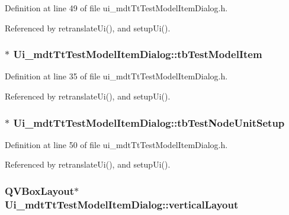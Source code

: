 Definition at line 49 of file ui\-\_\-mdt\-Tt\-Test\-Model\-Item\-Dialog.\-h.



Referenced by retranslate\-Ui(), and setup\-Ui().

\hypertarget{class_ui__mdt_tt_test_model_item_dialog_a3f8d368b30537ea891446850c9a14169}{
\subsubsection[{tb\-Test\-Model\-Item}]{$\ast$ Ui\-\_\-mdt\-Tt\-Test\-Model\-Item\-Dialog\-::tb\-Test\-Model\-Item}}\label{class_ui__mdt_tt_test_model_item_dialog_a3f8d368b30537ea891446850c9a14169}


Definition at line 35 of file ui\-\_\-mdt\-Tt\-Test\-Model\-Item\-Dialog.\-h.



Referenced by retranslate\-Ui(), and setup\-Ui().

\hypertarget{class_ui__mdt_tt_test_model_item_dialog_a64aab0eceb38eec9067c7d7ba2bf5fd9}{
\subsubsection[{tb\-Test\-Node\-Unit\-Setup}]{$\ast$ Ui\-\_\-mdt\-Tt\-Test\-Model\-Item\-Dialog\-::tb\-Test\-Node\-Unit\-Setup}}\label{class_ui__mdt_tt_test_model_item_dialog_a64aab0eceb38eec9067c7d7ba2bf5fd9}


Definition at line 50 of file ui\-\_\-mdt\-Tt\-Test\-Model\-Item\-Dialog.\-h.



Referenced by retranslate\-Ui(), and setup\-Ui().

\hypertarget{class_ui__mdt_tt_test_model_item_dialog_ab9d49ef493d8a1e57d1d15f2eed4a85f}{
\subsubsection[{vertical\-Layout}]{\setlength{\rightskip}{0pt plus 5cm}Q\-V\-Box\-Layout$\ast$ Ui\-\_\-mdt\-Tt\-Test\-Model\-Item\-Dialog\-::vertical\-Layout}}\label{class_ui__mdt_tt_test_model_item_dialog_ab9d49ef493d8a1e57d1d15f2eed4a85f}


